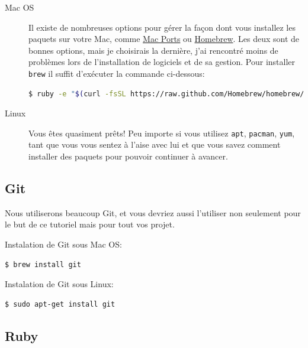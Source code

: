 \documentclass[]{report}
\begin{document}
      \begin{description}
        \item[Mac OS] Il existe de nombreuses options pour gérer la façon dont vous installez les paquets sur votre Mac, comme \href{https://www.macports.org/}{Mac Ports} ou \href{http://brew.sh/}{Homebrew}. Les deux sont de bonnes options, mais je choisirais la dernière, j'ai rencontré moins de problèmes lors de l'installation de logiciels et de sa gestion. Pour installer \verb|brew| il suffit d'exécuter la commande ci-dessous:
        \begin{scriptsize}
        \begin{lstlisting}[language=bash]
        $ ruby -e "$(curl -fsSL https://raw.github.com/Homebrew/homebrew/go/install)"
        \end{lstlisting}
        \end{scriptsize}
        \item[Linux] Vous êtes quasiment prêts! Peu importe si vous utilisez \verb|apt|, \verb|pacman|, \verb|yum|, tant que vous vous sentez à l'aise avec lui et que vous savez comment installer des paquets pour pouvoir continuer à avancer.
      \end{description}

    \subsection{Git}
      \label{setup_git}

      Nous utiliserons beaucoup Git, et vous devriez aussi l'utiliser non seulement pour le but de ce tutoriel mais pour tout vos projet.

      Instalation de Git sous Mac OS:
      \begin{scriptsize}
      \begin{lstlisting}[language=bash]
      $ brew install git
      \end{lstlisting}
      \end{scriptsize}

      Instalation de Git sous Linux:
      \begin{scriptsize}
      \begin{lstlisting}[language=bash]
      $ sudo apt-get install git
      \end{lstlisting}
      \end{scriptsize}

    \subsection{Ruby}
\end{document}
